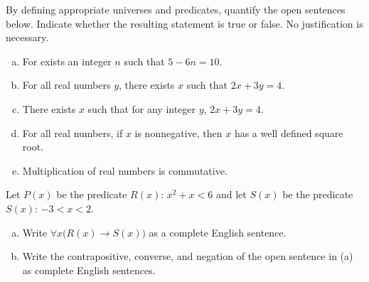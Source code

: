 \documentclass[11pt,letterpaper]{article}
\begin{document}
\newpage



 By defining appropriate universes and predicates, quantify the open sentences below. Indicate whether the resulting statement is true or false. No justification is necessary. 
	\begin{enumerate}[(a)]
	\item For exists an integer $n$ such that $5 - 6n= 10$.
	\item For all real numbers $y$, there exists $x$ such that $2x + 3y= 4$.
	\item There exists $x$ such that for any integer $y$, $2x + 3y= 4$. 
	\item For all real numbers, if $x$ is nonnegative, then $x$ has a well defined square root. 
	\item Multiplication of real numbers is commutative. 
	\end{enumerate} 



\newpage



 Let $P(x)$ be the predicate $R(x)$: $x^2 + x < 6$ and let $S(x)$ be the predicate $S(x)$: $-3 < x < 2$.  
	\begin{enumerate}[(a)]
	\item Write $\forall x \big( R(x) \to S(x) \big)$ as a complete English sentence.
	\item Write the contrapositive, converse, and negation of the open sentence in (a) as complete English sentences. 
	\end{enumerate} 
\end{document}
